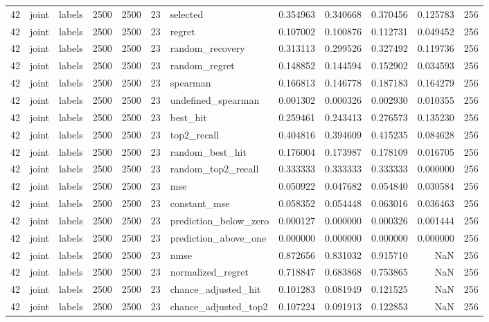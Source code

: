 \begin{tabular}{rllrrrlrrrrr}
42 & joint & labels & 2500 & 2500 & 23 & selected & 0.354963 & 0.340668 & 0.370456 & 0.125783 & 256 \\
42 & joint & labels & 2500 & 2500 & 23 & regret & 0.107002 & 0.100876 & 0.112731 & 0.049452 & 256 \\
42 & joint & labels & 2500 & 2500 & 23 & random_recovery & 0.313113 & 0.299526 & 0.327492 & 0.119736 & 256 \\
42 & joint & labels & 2500 & 2500 & 23 & random_regret & 0.148852 & 0.144594 & 0.152902 & 0.034593 & 256 \\
42 & joint & labels & 2500 & 2500 & 23 & spearman & 0.166813 & 0.146778 & 0.187183 & 0.164279 & 256 \\
42 & joint & labels & 2500 & 2500 & 23 & undefined_spearman & 0.001302 & 0.000326 & 0.002930 & 0.010355 & 256 \\
42 & joint & labels & 2500 & 2500 & 23 & best_hit & 0.259461 & 0.243413 & 0.276573 & 0.135230 & 256 \\
42 & joint & labels & 2500 & 2500 & 23 & top2_recall & 0.404816 & 0.394609 & 0.415235 & 0.084628 & 256 \\
42 & joint & labels & 2500 & 2500 & 23 & random_best_hit & 0.176004 & 0.173987 & 0.178109 & 0.016705 & 256 \\
42 & joint & labels & 2500 & 2500 & 23 & random_top2_recall & 0.333333 & 0.333333 & 0.333333 & 0.000000 & 256 \\
42 & joint & labels & 2500 & 2500 & 23 & mse & 0.050922 & 0.047682 & 0.054840 & 0.030584 & 256 \\
42 & joint & labels & 2500 & 2500 & 23 & constant_mse & 0.058352 & 0.054448 & 0.063016 & 0.036463 & 256 \\
42 & joint & labels & 2500 & 2500 & 23 & prediction_below_zero & 0.000127 & 0.000000 & 0.000326 & 0.001444 & 256 \\
42 & joint & labels & 2500 & 2500 & 23 & prediction_above_one & 0.000000 & 0.000000 & 0.000000 & 0.000000 & 256 \\
42 & joint & labels & 2500 & 2500 & 23 & nmse & 0.872656 & 0.831032 & 0.915710 & NaN & 256 \\
42 & joint & labels & 2500 & 2500 & 23 & normalized_regret & 0.718847 & 0.683868 & 0.753865 & NaN & 256 \\
42 & joint & labels & 2500 & 2500 & 23 & chance_adjusted_hit & 0.101283 & 0.081949 & 0.121525 & NaN & 256 \\
42 & joint & labels & 2500 & 2500 & 23 & chance_adjusted_top2 & 0.107224 & 0.091913 & 0.122853 & NaN & 256 \\

\end{tabular}
